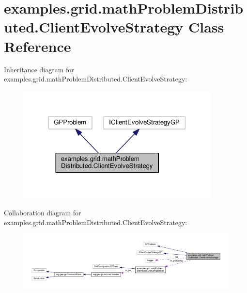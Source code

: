 \hypertarget{classexamples_1_1grid_1_1math_problem_distributed_1_1_client_evolve_strategy}{\section{examples.\-grid.\-math\-Problem\-Distributed.\-Client\-Evolve\-Strategy Class Reference}
\label{classexamples_1_1grid_1_1math_problem_distributed_1_1_client_evolve_strategy}
}


Inheritance diagram for examples.\-grid.\-math\-Problem\-Distributed.\-Client\-Evolve\-Strategy\-:
\nopagebreak
\begin{figure}[H]
\begin{center}
\leavevmode
\includegraphics[width=291pt]{classexamples_1_1grid_1_1math_problem_distributed_1_1_client_evolve_strategy__inherit__graph}
\end{center}
\end{figure}


Collaboration diagram for examples.\-grid.\-math\-Problem\-Distributed.\-Client\-Evolve\-Strategy\-:
\nopagebreak
\begin{figure}[H]
\begin{center}
\leavevmode
\includegraphics[width=350pt]{classexamples_1_1grid_1_1math_problem_distributed_1_1_client_evolve_strategy__coll__graph}
\end{center}
\end{figure}
